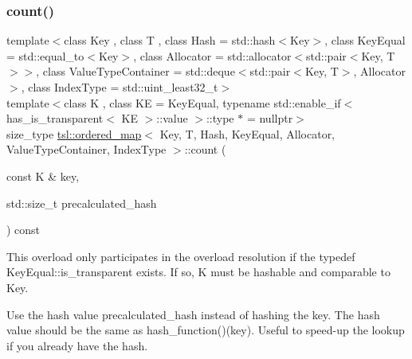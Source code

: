 \subsubsection{\texorpdfstring{count()}{count()}\hspace{0.1cm}{\footnotesize\ttfamily [3/3]}}
{\footnotesize\ttfamily template$<$class Key , class T , class Hash  = std\+::hash$<$\+Key$>$, class Key\+Equal  = std\+::equal\+\_\+to$<$\+Key$>$, class Allocator  = std\+::allocator$<$std\+::pair$<$\+Key, T$>$$>$, class Value\+Type\+Container  = std\+::deque$<$std\+::pair$<$\+Key, T$>$, Allocator$>$, class Index\+Type  = std\+::uint\+\_\+least32\+\_\+t$>$ \\
template$<$class K , class KE  = Key\+Equal, typename std\+::enable\+\_\+if$<$ has\+\_\+is\+\_\+transparent$<$ K\+E $>$\+::value $>$\+::type $\ast$  = nullptr$>$ \\
size\+\_\+type \mbox{\hyperlink{classtsl_1_1ordered__map}{tsl\+::ordered\+\_\+map}}$<$ Key, T, Hash, Key\+Equal, Allocator, Value\+Type\+Container, Index\+Type $>$\+::count (\begin{DoxyParamCaption}\item[{const K \&}]{key,  }\item[{std\+::size\+\_\+t}]{precalculated\+\_\+hash }\end{DoxyParamCaption}) const\hspace{0.3cm}{\ttfamily [inline]}}





This overload only participates in the overload resolution if the typedef Key\+Equal\+::is\+\_\+transparent exists. If so, K must be hashable and comparable to Key.

Use the hash value \textquotesingle{}precalculated\+\_\+hash\textquotesingle{} instead of hashing the key. The hash value should be the same as hash\+\_\+function()(key). Useful to speed-\/up the lookup if you already have the hash. \mbox{\label{classtsl_1_1ordered__map_aad8598e2f2dfeed429cfe80a1884ba20}} 
